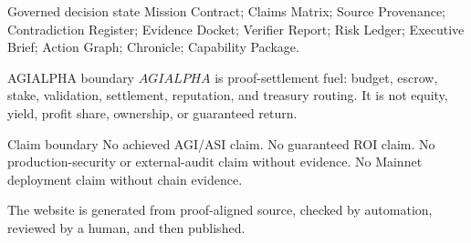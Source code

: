 \documentclass[10pt,landscape]{article}
\begin{document}
\begin{minipage}[t]{0.31\linewidth}
\begin{card}{Governed decision state}
Mission Contract; Claims Matrix; Source Provenance; Contradiction Register; Evidence Docket; Verifier Report; Risk Ledger; Executive Brief; Action Graph; Chronicle; Capability Package.
\end{card}
\begin{card}{AGIALPHA boundary}
$AGIALPHA$ is proof-settlement fuel: budget, escrow, stake, validation, settlement, reputation, and treasury routing. It is not equity, yield, profit share, ownership, or guaranteed return.
\end{card}
\begin{card}{Claim boundary}
No achieved AGI/ASI claim. No guaranteed ROI claim. No production-security or external-audit claim without evidence. No Mainnet deployment claim without chain evidence.
\end{card}
\end{minipage}
\vspace{2mm}
\begin{center}
\end{center}
\begin{hero}The website is generated from proof-aligned source, checked by automation, reviewed by a human, and then published.\end{hero}
\end{document}
